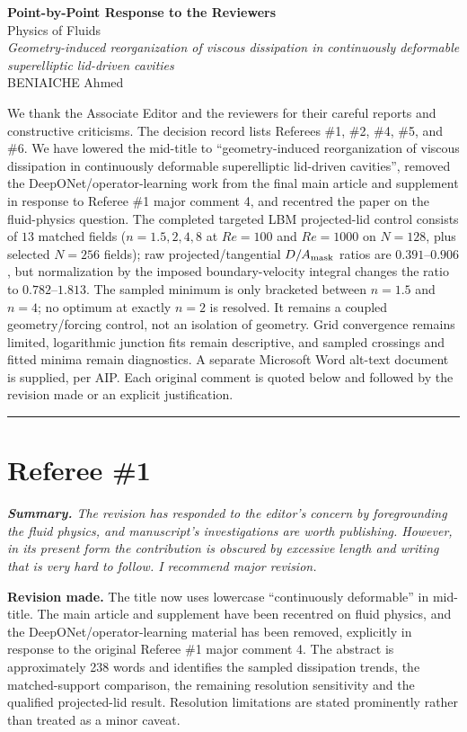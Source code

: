 \documentclass[11pt,a4paper]{article}
\newcommand{\qcomment}[1]{\textcolor{deepblue}{\itshape #1}}
\newcommand{\revwork}[1]{\textbf{\textcolor{revgreen}{#1}}}
\newcommand{\ruleline}{\begin{center}\rule{0.6\textwidth}{0.6pt}\end{center}}
\begin{document}
\begin{center}
{\LARGE\bfseries Point-by-Point Response to the Reviewers}\\[2mm]
{\large Physics of Fluids}\\[2mm]
{\large \emph{Geometry-induced reorganization of viscous dissipation in continuously deformable superelliptic lid-driven cavities}}\\[2mm]
BENIAICHE Ahmed
\end{center}

\vspace{3mm}
We thank the Associate Editor and the reviewers for their careful reports and constructive criticisms. The decision record lists Referees \#1, \#2, \#4, \#5, and \#6. We have lowered the mid-title to ``geometry-induced reorganization of viscous dissipation in continuously deformable superelliptic lid-driven cavities'', removed the DeepONet/operator-learning work from the final main article and supplement in response to Referee \#1 major comment 4, and recentred the paper on the fluid-physics question. The completed targeted LBM projected-lid control consists of $13$ matched fields ($n=1.5,2,4,8$ at $Re=100$ and $Re=1000$ on $N=128$, plus selected $N=256$ fields); raw projected/tangential $D/A_{\rm mask}$ ratios are $0.391$--$0.906$, but normalization by the imposed boundary-velocity integral changes the ratio to $0.782$--$1.813$. The sampled minimum is only bracketed between $n=1.5$ and $n=4$; no optimum at exactly $n=2$ is resolved. It remains a coupled geometry/forcing control, not an isolation of geometry. Grid convergence remains limited, logarithmic junction fits remain descriptive, and sampled crossings and fitted minima remain diagnostics. A separate Microsoft Word alt-text document is supplied, per AIP. Each original comment is quoted below and followed by the revision made or an explicit justification.

\bigskip
\ruleline
\section*{Referee \#1}

\medskip
\noindent\qcomment{\textbf{Summary.} The revision has responded to the editor's concern by foregrounding the fluid physics, and manuscript's investigations are worth publishing. However, in its present form the contribution is obscured by excessive length and writing that is very hard to follow. I recommend major revision.}

\noindent\revwork{Revision made.} The title now uses lowercase ``continuously deformable'' in mid-title. The main article and supplement have been recentred on fluid physics, and the DeepONet/operator-learning material has been removed, explicitly in response to the original Referee \#1 major comment 4. The abstract is approximately 238 words and identifies the sampled dissipation trends, the matched-support comparison, the remaining resolution sensitivity and the qualified projected-lid result. Resolution limitations are stated prominently rather than treated as a minor caveat.
\end{document}
